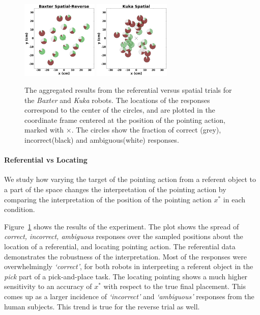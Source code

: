 \begin{figure}[ht!]
    \includegraphics[width=0.325\textwidth ]{figures/baxter_Spatial-Reverse_.png}
    \includegraphics[width=0.325\textwidth ]{figures/kuka_Spatial_.png}
    \caption{The aggregated results from the referential versus spatial trials for the \textit{Baxter} and \textit{Kuka} robots. The locations of the responses correspond to the center of the circles, and are plotted in the coordinate frame centered at the position of the pointing action, marked with $\times$. The circles show the fraction of correct (grey), incorrect(black) and ambiguous(white) responses.}
    \label{fig:aggregatesimple}
\end{figure}

\paragraph{Referential vs Locating}
We study how varying the target of the pointing action from a referent object to a part of the space changes the interpretation of the pointing action by comparing the interpretation of the position of the pointing action $x^*$ in each condition. 

Figure~\ref{fig:aggregatesimple} shows the results of the experiment. The plot shows the spread of \textit{correct, incorrect, ambiguous} responses over the sampled positions about the location of a referential, and locating pointing action. The referential data demonstrates the robustness of the interpretation. Most of the responses were overwhelmingly \textit{`correct'}, for both robots in interpreting a referent object in the \textit{pick} part of a pick-and-place task. The locating pointing shows a much higher sensitivity to an accuracy of $x^*$ with respect to the true final placement. This comes up as a larger incidence of \textit{`incorrect'} and \textit{`ambiguous'} responses from the human subjects. This trend is true for the reverse trial as well.

